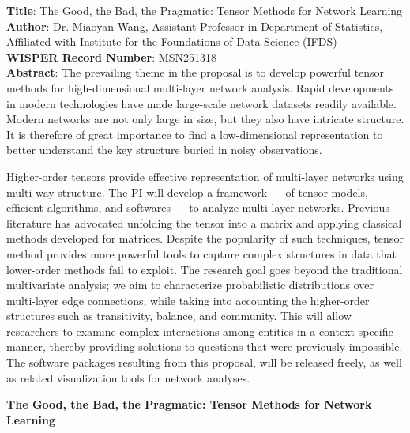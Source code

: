 \documentclass[10pt]{article}
\theoremstyle{plain}
\theoremstyle{definition}
\begin{document}
\begin{doublespace}

{\bf Title}: The Good, the Bad, the Pragmatic: Tensor Methods for Network Learning \\

{\bf Author}: Dr. Miaoyan Wang, Assistant Professor in Department of Statistics, Affiliated with Institute for the Foundations of Data Science (IFDS)\\

{\bf WISPER Record Number}: MSN251318\\

{\bf Abstract}: The prevailing theme in the proposal is to develop powerful tensor methods for high-dimensional multi-layer network analysis. Rapid developments in modern technologies have made large-scale network datasets readily available. Modern networks are not only large in size, but they also have intricate structure. It is therefore of great importance to find a low-dimensional representation to better understand the key structure buried in noisy observations. 

Higher-order tensors provide effective representation of multi-layer networks using multi-way structure. The PI will develop a framework --- of tensor models, efficient algorithms, and softwares --- to analyze multi-layer networks. Previous literature has advocated unfolding the tensor into a matrix and applying classical methods developed for matrices. Despite the popularity of such techniques, tensor method provides more powerful tools to capture complex structures in data that lower-order methods fail to exploit. The research goal goes beyond the traditional multivariate analysis; we aim to characterize probabilistic distributions over multi-layer edge connections, while taking into accounting the higher-order structures such as transitivity, balance, and community. This will allow researchers to examine complex interactions among entities in a context-specific manner, thereby providing solutions to questions that were previously impossible. The software packages resulting from this proposal, will be released freely, as well as related visualization tools for network analyses.
\end{doublespace}
\newpage

\begin{center}
\vspace{.2cm}
{\bf \large The Good, the Bad, the Pragmatic: Tensor Methods for Network Learning }\\
\end{center}
\vspace{.2cm}
\end{document}
